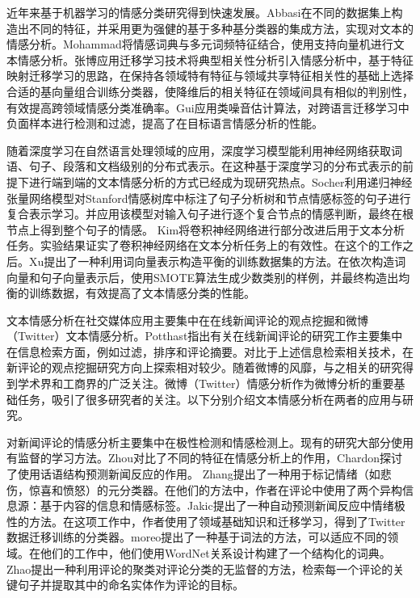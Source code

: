 近年来基于机器学习的情感分类研究得到快速发展。Abbasi在不同的数据集上构造出不同的特征，并采用更为强健的基于多种基分类器的集成方法，实现对文本的情感分析。Mohammad将情感词典与多元词频特征结合，使用支持向量机进行文本情感分析。张博应用迁移学习技术将典型相关性分析引入情感分析中，基于特征映射迁移学习的思路，在保持各领域特有特征与领域共享特征相关性的基础上选择合适的基向量组合训练分类器，使降维后的相关特征在领域间具有相似的判别性，有效提高跨领域情感分类准确率。Gui应用类噪音估计算法，对跨语言迁移学习中负面样本进行检测和过滤，提高了在目标语言情感分析的性能。

随着深度学习在自然语言处理领域的应用，深度学习模型能利用神经网络获取词语、句子、段落和文档级别的分布式表示。在这种基于深度学习的分布式表示的前提下进行端到端的文本情感分析的方式已经成为现研究热点。Socher利用递归神经张量网络模型对Stanford情感树库中标注了句子分析树和节点情感标签的句子进行复合表示学习。并应用该模型对输入句子进行逐个复合节点的情感判断，最终在根节点上得到整个句子的情感。 Kim将卷积神经网络进行部分改进后用于文本分析任务。实验结果证实了卷积神经网络在文本分析任务上的有效性。在这个的工作之后。Xu提出了一种利用词向量表示构造平衡的训练数据集的方法。在依次构造词向量和句子向量表示后，使用SMOTE算法生成少数类别的样例，并最终构造出均衡的训练数据，有效提高了文本情感分类的性能。

文本情感分析在社交媒体应用主要集中在在线新闻评论的观点挖掘和微博（Twitter）文本情感分析。Potthast指出有关在线新闻评论的研究工作主要集中在信息检索方面，例如过滤，排序和评论摘要。对比于上述信息检索相关技术，在新评论的观点挖掘研究方向上探索相对较少。随着微博的风靡，与之相关的研究得到学术界和工商界的广泛关注。微博（Twitter）情感分析作为微博分析的重要基础任务，吸引了很多研究者的关注。以下分别介绍文本情感分析在两者的应用与研究。

对新闻评论的情感分析主要集中在极性检测和情感检测上。现有的研究大部分使用有监督的学习方法。Zhou对比了不同的特征在情感分析上的作用，Chardon探讨了使用话语结构预测新闻反应的作用。 Zhang提出了一种用于标记情绪（如悲伤，惊喜和愤怒）的元分类器。在他们的方法中，作者在评论中使用了两个异构信息源：基于内容的信息和情感标签。Jakic提出了一种自动预测新闻反应中情绪极性的方法。在这项工作中，作者使用了领域基础知识和迁移学习，得到了Twitter数据迁移训练的分类器。moreo提出了一种基于词法的方法，可以适应不同的领域。在他们的工作中，他们使用WordNet关系设计构建了一个结构化的词典。 Zhao提出一种利用评论的聚类对评论分类的无监督的方法，检索每一个评论的关键句子并提取其中的命名实体作为评论的目标。

